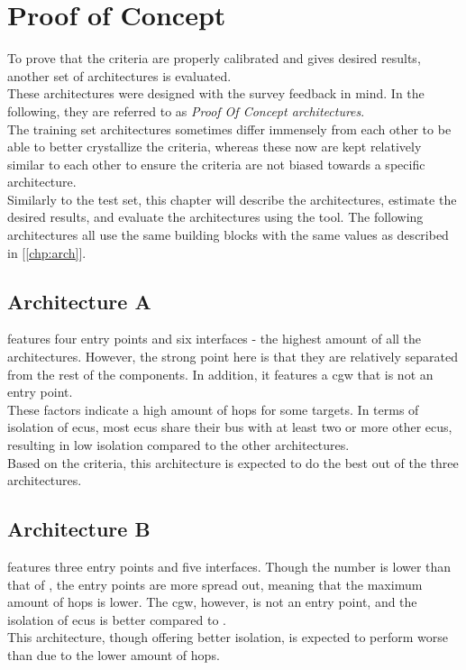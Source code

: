 \chapter{Proof of Concept}
\label{chp:compeval}

To prove that the criteria are properly calibrated and gives desired results, another set of architectures is evaluated.\\
These architectures were designed with the survey feedback in mind.
In the following, they are referred to as \textit{Proof Of Concept architectures}.\\
The training set architectures sometimes differ immensely from each other to be able to better crystallize the criteria,
whereas these now are kept relatively similar to each other to ensure the criteria are not biased towards a specific architecture.\\
Similarly to the test set, this chapter will describe the architectures, estimate the desired results, and evaluate the architectures using the tool.
The following architectures all use the same building blocks with the same values as described in [\ref{chp:arch}].

\section{Architecture A}
\label{sec:archa}

 features four entry points and six interfaces - the highest amount of all the architectures.
However, the strong point here is that they are relatively separated from the rest of the components.
In addition, it features a \acrshort{cgw} that is not an entry point.\\
These factors indicate a high amount of hops for some targets.
In terms of isolation of \acrshort{ecu}s, most \acrshort{ecu}s share their bus with at least two or more other \acrshort{ecu}s, resulting in low isolation compared to the other architectures.\\
Based on the criteria, this architecture is expected to do the best out of the three architectures.

\section{Architecture B}
\label{sec:archb}

 features three entry points and five interfaces.
Though the number is lower than that of , the entry points are more spread out, meaning that the maximum amount of hops is lower.
The \acrshort{cgw}, however, is not an entry point, and the isolation of \acrshort{ecu}s is better compared to .\\
This architecture, though offering better isolation, is expected to perform worse than  due to the lower amount of hops.

